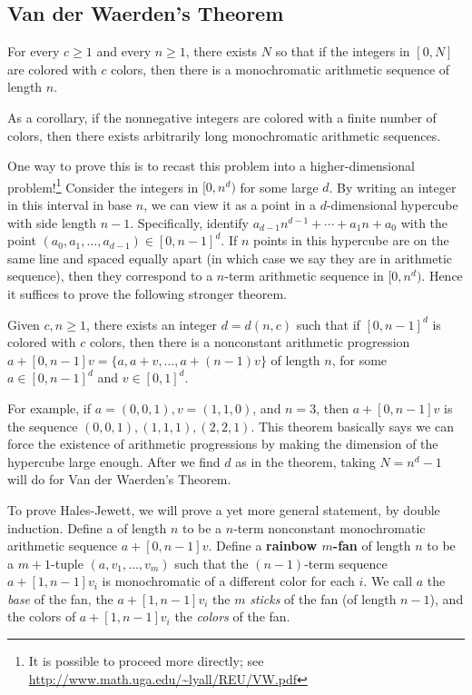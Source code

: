 \subsection{Van der Waerden's Theorem}
\begin{thm} \label{vdw}
For every $c\geq 1$ and every $n\geq 1$, there exists $N$ so that if the integers in $[0,N]$ are colored with $c$ colors, then there is a monochromatic arithmetic sequence of length $n$.

As a corollary, if the nonnegative integers are colored with a finite number of colors, then there exists arbitrarily long monochromatic arithmetic sequences.
\end{thm}
One way to prove this is to recast this problem into a higher-dimensional problem!{\footnote{It is possible to proceed more directly; see \url{http://www.math.uga.edu/~lyall/REU/VW.pdf}}} Consider the integers in $[0,n^d)$ for some large $d$. By writing an integer in this interval in base $n$, we can view it as a point in a $d$-dimensional hypercube with side length $n-1$. Specifically, identify $a_{d-1}n^{d-1}+\cdots +a_1n+a_0$ with the point $(a_0,a_1,\ldots, a_{d-1})\in [0,n-1]^d$. If $n$ points in this hypercube are on the same line and spaced equally apart (in which case we say they are in arithmetic sequence), then they correspond to a $n$-term arithmetic sequence in $[0,n^d)$. Hence it suffices to prove the following stronger theorem.

\begin{thm} Given $c,n\geq 1$, there exists an integer $d=d(n,c)$ such that if $[0,n-1]^d$ is colored with $c$ colors, then there is a nonconstant arithmetic progression $a+[0,n-1]v=\{a,a+v,\ldots, a+(n-1)v\}$ of length $n$, for some $a\in [0,n-1]^d$ and $v\in [0,1]^d$.
\end{thm}
For example, if $a=(0,0,1),v=(1,1,0)$, and $n=3$, then $a+[0,n-1]v$ is the sequence $(0,0,1), (1,1,1), (2,2,1)$. This theorem basically says we can force the existence of arithmetic progressions by making the dimension of the hypercube large enough. After we find $d$ as in the theorem, taking $N=n^d-1$ will do for Van der Waerden's Theorem.

To prove Hales-Jewett, we will prove a yet more general statement, by double induction. Define a  of length $n$ to be a $n$-term nonconstant monochromatic arithmetic sequence $a+[0,n-1]v$. Define a \textbf{rainbow $m$-fan} of length $n$ to be a $m+1$-tuple $(a,v_1,\ldots, v_m)$ such that the $(n-1)$-term sequence $a+[1,n-1]v_i$ is monochromatic of a different color for each $i$. We call $a$ the {\it base} of the fan, the $a+[1,n-1]v_i$ the $m$ {\it sticks} of the fan (of length $n-1$), and the colors of $a+[1,n-1]v_i$ the {\it colors} of the fan.

